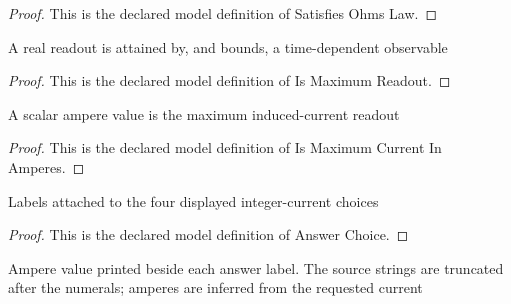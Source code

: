 \begin{proof}
  This is the declared model definition of Satisfies Ohms Law.
\end{proof}
\begin{definition}
  \label{def:physics:phyx-mini-0931:phyxminiproblems-problemphyxmini0931-ismaximumreadout}
  A real readout is attained by, and bounds, a time-dependent observable
\end{definition}
\begin{proof}
  This is the declared model definition of Is Maximum Readout.
\end{proof}
\begin{definition}
  \label{def:physics:phyx-mini-0931:phyxminiproblems-problemphyxmini0931-ismaximumcurrentinamperes}
  A scalar ampere value is the maximum induced-current readout
\end{definition}
\begin{proof}
  This is the declared model definition of Is Maximum Current In Amperes.
\end{proof}
\begin{definition}
  \label{def:physics:phyx-mini-0931:phyxminiproblems-problemphyxmini0931-answerchoice}
  Labels attached to the four displayed integer-current choices
\end{definition}
\begin{proof}
  This is the declared model definition of Answer Choice.
\end{proof}
\begin{definition}
  \label{def:physics:phyx-mini-0931:phyxminiproblems-problemphyxmini0931-answerchoice-displayedcurrentinamperes}
  Ampere value printed beside each answer label. The source strings are truncated after the numerals; amperes are inferred from the requested current
\end{definition}

